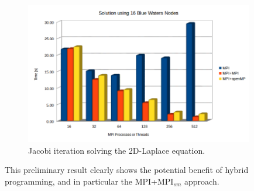 \begin{figure}[h!]
    \centering
    \includegraphics[width=100mm]{Plots/section4/bw2-16.png}
    \caption{Jacobi iteration solving the 2D-Laplace equation.}
    \label{fig:Figure5}
\end{figure}

This preliminary result clearly shows the potential benefit of hybrid programming, and in particular the MPI+MPI$_{sm}$ approach.

